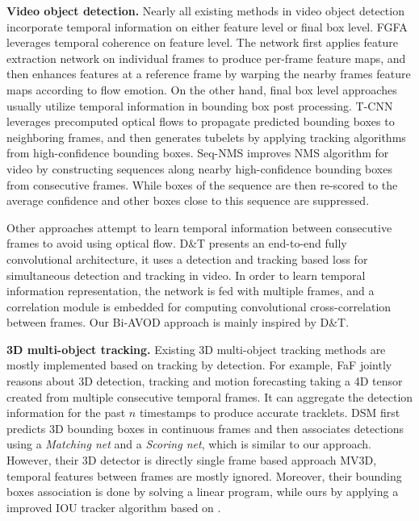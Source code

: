\documentclass{bmvc2k}
\begin{document}
\textbf{Video object detection.} Nearly all existing methods in video object detection incorporate temporal information on either feature level or final box level. FGFA \cite{zhu2017flow} leverages temporal coherence on feature level. The network first applies feature extraction network on individual frames to produce per-frame feature maps, and then enhances features at a reference frame by warping the nearby frames feature maps according to flow emotion. On the other hand, final box level approaches usually utilize temporal information in bounding box post processing. T-CNN \cite{kang2018t, kang2016object} leverages precomputed optical flows to propagate predicted bounding boxes to neighboring frames, and then generates tubelets by applying tracking algorithms from high-confidence bounding boxes. Seq-NMS \cite{han2016seq} improves NMS algorithm for video by constructing sequences along nearby high-confidence bounding boxes from consecutive frames. While boxes of the sequence are then re-scored to the average confidence and other boxes close to this sequence are suppressed. 

Other approaches attempt to learn temporal information between consecutive frames to avoid using optical flow. D\&T \cite{feichtenhofer2017detect} presents an end-to-end fully convolutional architecture, it uses a detection and tracking based loss for simultaneous detection and tracking in video. In order to learn temporal information representation, the network is fed with multiple frames, and a correlation module is embedded for computing convolutional cross-correlation between frames. Our Bi-AVOD approach is mainly inspired by D\&T. 

\textbf{3D multi-object tracking.} Existing 3D multi-object tracking methods are mostly implemented based on tracking by detection. For example, FaF \cite{luo2018fast} jointly reasons about 3D detection, tracking and motion forecasting taking a 4D tensor created from multiple consecutive temporal frames. It can aggregate the detection information for the past $n$ timestamps to produce accurate tracklets. DSM \cite{frossard2018end} first predicts 3D bounding boxes in continuous frames and then associates detections using a \textit{Matching net} and a \textit{Scoring net}, which is similar to our approach. However, their 3D detector is directly single frame based approach MV3D\cite{chen2017multi}, temporal features between frames are mostly ignored. Moreover, their bounding boxes association is done by solving a linear program, while ours by applying a improved IOU tracker algorithm based on \cite{bochinski2018extending}. 
\end{document}
